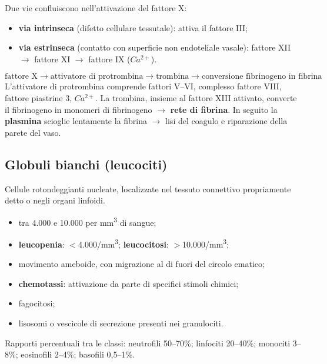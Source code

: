 Due vie confluiscono nell'attivazione del fattore X:
\begin{itemize}
  \item \textbf{via intrinseca} (difetto cellulare tessutale): attiva il fattore III;
  \item \textbf{via estrinseca} (contatto con superficie non endoteliale vasale): fattore XII $\rightarrow$ fattore XI $\rightarrow$ fattore IX ($Ca^{2+}$).
\end{itemize}
$$\text{fattore X} \rightarrow \text{attivatore di protrombina} \rightarrow \text{trombina} \rightarrow \text{conversione fibrinogeno in fibrina}$$
L'attivatore di protrombina comprende fattori V--VI, complesso fattore VIII, fattore piastrine 3, $Ca^{2+}$. La trombina, insieme al fattore XIII attivato, converte il fibrinogeno in monomeri di fibrinogeno $\rightarrow$ \textbf{rete di fibrina}. In seguito la \textbf{plasmina} scioglie lentamente la fibrina $\rightarrow$ lisi del coagulo e riparazione della parete del vaso.

\subsection{Globuli bianchi (leucociti)}

Cellule rotondeggianti nucleate, localizzate nel tessuto connettivo propriamente detto o negli organi linfoidi.
\begin{itemize}
  \item tra 4.000 e 10.000 per mm\textsuperscript{3} di sangue;
  \item \textbf{leucopenia}: $<$4.000/mm\textsuperscript{3}; \textbf{leucocitosi}: $>$10.000/mm\textsuperscript{3};
  \item movimento ameboide, con migrazione al di fuori del circolo ematico;
  \item \textbf{chemotassi}: attivazione da parte di specifici stimoli chimici;
  \item fagocitosi;
  \item lisosomi o vescicole di secrezione presenti nei granulociti.
\end{itemize}

Rapporti percentuali tra le classi: neutrofili 50--70\%; linfociti 20--40\%; monociti 3--8\%; eosinofili 2--4\%; basofili 0,5--1\%.

